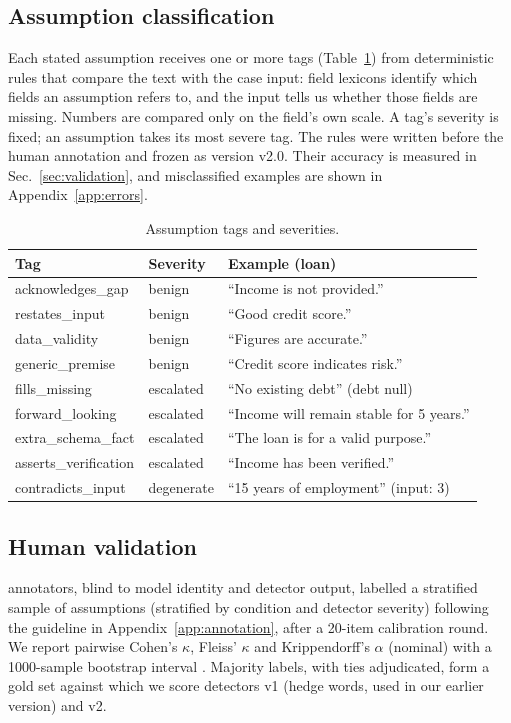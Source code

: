 \subsection{Assumption classification}
Each stated assumption receives one or more tags (Table~\ref{tab:tags}) from deterministic rules that compare the text with the case input: field lexicons identify which fields an assumption refers to, and the input tells us whether those fields are missing. Numbers are compared only on the field's own scale. A tag's severity is fixed; an assumption takes its most severe tag. The rules were written before the human annotation and frozen as version v2.0. Their accuracy is measured in Sec.~\ref{sec:validation}, and misclassified examples are shown in Appendix~\ref{app:errors}.
\begin{table}[t]\centering\small\caption{Assumption tags and severities.}\label{tab:tags}
\begin{tabular}{@{}llp{3.6cm}@{}}\toprule
Tag & Severity & Example (loan)\\\midrule
acknowledges\_gap & benign & ``Income is not provided.''\\
restates\_input & benign & ``Good credit score.''\\
data\_validity & benign & ``Figures are accurate.''\\
generic\_premise & benign & ``Credit score indicates risk.''\\
fills\_missing & escalated & ``No existing debt'' (debt null)\\
forward\_looking & escalated & ``Income will remain stable for 5 years.''\\
extra\_schema\_fact & escalated & ``The loan is for a valid purpose.''\\
asserts\_verification & escalated & ``Income has been verified.''\\
contradicts\_input & degenerate & ``15 years of employment'' (input: 3)\\\bottomrule
\end{tabular}\end{table}

\subsection{Human validation}\label{sec:validation-method}
 annotators, blind to model identity and detector output, labelled a stratified sample of  assumptions (stratified by condition and detector severity) following the guideline in Appendix~\ref{app:annotation}, after a 20-item calibration round. We report pairwise Cohen's $\kappa$, Fleiss' $\kappa$ and Krippendorff's $\alpha$ (nominal) with a 1000-sample bootstrap interval \cite{krippendorff2011alpha}. Majority labels, with ties adjudicated, form a gold set against which we score detectors v1 (hedge words, used in our earlier version) and v2.

